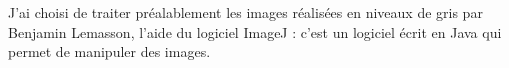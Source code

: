 J'ai choisi de traiter pr\'ealablement les images r\'ealis\'ees en niveaux de gris par Benjamin Lemasson,  l'aide du logiciel ImageJ : %
c'est un logiciel \'ecrit en Java qui permet de manipuler des images.
\begin{comment}%
%
\begin{description}
\item[Travail sur des images individuelles] Une fonctionnalit\'e importante est la d\'elimitation de r\'egions d'int\'er\^et : %
enc\'ephale dans une coupe bidimensionnelle, zone l\'es\'ee caract\'eris\'ee, typiquement, par des valeurs basses d'ADC ou de CBF. %
D'autres fonctionnalit\'es plus classiques sont disponobles : remplissage, rognage etc.
%
\begin{figure}[H]
\begin{center}
\texttt{[image: methodes/11-J00-segADC-slice-10.jpg]}%
\hfill
\texttt{[image: methodes/11-J03-segADC-slice-10.jpg]}%
\hfill
\texttt{[image: methodes/11-J08-segADC-slice-10.jpg]}%
\end{center}
\caption{Coupe segment\'ee : rat 11, images en ADC sur trois jours}
\label{ex_cer}
\end{figure}
%
\begin{figure}[H]
\begin{center}
\texttt{[image: methodes/11-J00-ADC-cropped-slice10.jpg]}%
\hfill
\texttt{[image: methodes/11-J03-ADC-cropped-slice10.jpg]}%
\hfill
\texttt{[image: methodes/11-J08-ADC-cropped-slice10.jpg]}%
\end{center}
\caption{L\'esion d\'elimit\'ee au jour 0 : faibles valeurs de l'ADC. On r\'eutilise la r\'egion d'int\'er\^et pour les autres jours.}
\label{ex_les}
\end{figure}
%
\item[Exploitation de donn\'ees sous diff\'erents formats] On peut convertir des fichiers afin de les rendre exploitables par d'autres logiciels : %
images en .jpg pour une pr\'esentation, fichiers texte avec les coordonn\'ees et les valeurs, repr\'esent\'ees en niveaux de gris, des diff\'erents pixels.
%
\item[Traitement syst\'ematique avec des macros] Le logiciel permet de cr\'eer des macros afin de traiter syst\'ematiquement un grand nombre d'images : %
en effet la d\'elimitation de r\'egions d'int\'er\^et et leur exploitation est fastidieuse, et ces petits programmes permettent de traiter rapidement et avec fiabilit\'e des centaines d'images.
%
\begin{itemize}
\item
\item 
\end{itemize}
\end{description}
\end{comment}
